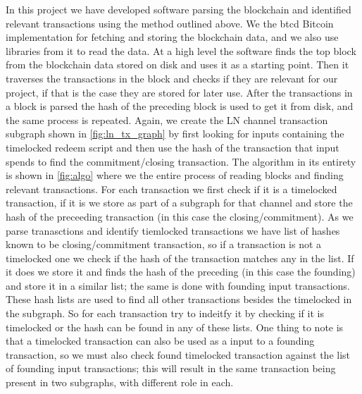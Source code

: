 In this project we have developed software parsing the blockchain and identified relevant transactions using the method outlined above.
We the btcd \cite{btcd_roasbeef} Bitcoin implementation for fetching and storing the blockchain data, and we also use libraries from it to read the data.
At a high level the software finds the top block from the blockchain data stored on disk and uses it as a starting point.
Then it traverses the transactions in the block and checks if they are relevant for our project, if that is the case they are stored for later use. After the transactions in a block is parsed the hash of the preceding block is used to get it from disk, and the same process is repeated.
Again, we create the LN channel transaction subgraph shown in \cref{fig:ln_tx_graph} by first looking for inputs containing the timelocked redeem script and then use the hash of the transaction that input spends to find the commitment/closing transaction.
The algorithm in its entirety is shown in \cref{fig:algo} where we the entire process of reading blocks and finding relevant transactions.
For each transaction we first check if it is a timelocked transaction, if it is we store as part of a subgraph for that channel and store the hash of the preceeding transaction (in this case the closing/commitment). As we parse tranasctions and identify tiemlocked transactions we have list of hashes known to be closing/commitment transaction, so if a transaction is not a timelocked one we check if the hash of the transaction matches any in the list. If it does we store it and finds the hash of the preceding (in this case the founding) and store it in a similar list; the same is done with founding input transactions. These hash lists are used to find all other transactions besides the timelocked in the subgraph. So for each transaction try to indeitfy it by checking if it is timelocked or the hash can be found in any of these lists. One thing to note is that a timelocked transaction can also be used as a input to a founding transaction, so we must also check found timelocked transaction against the list of founding input transactions; this will result in the same transaction being present in two subgraphs, with different role in each.

